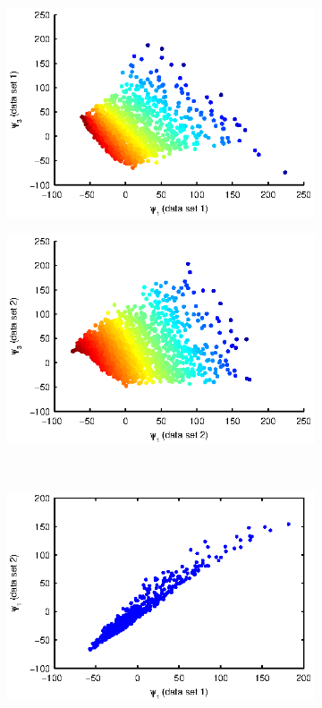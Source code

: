 \begin{figure}[t]
\centering
\begin{subfigure}{0.4\textwidth}
\includegraphics[width=\textwidth]{rxn_NLICA1}
\caption{}
\label{subfig:rxn_embedding1}
\end{subfigure}
\begin{subfigure}{0.4\textwidth}
\includegraphics[width=\textwidth]{rxn_NLICA2}
\caption{}
\label{subfig:rxn_embedding2}
\end{subfigure}\\
\begin{subfigure}{0.4\textwidth}
\includegraphics[width=\textwidth]{rxn_NLICA_corr1}

\end{subfigure}
\end{figure}
